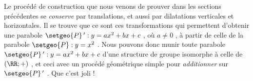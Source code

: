 Le procédé de construction que nous venons de prouver dans les sections précédentes se \emph{\og conserve \fg} par translations, et aussi par dilatations verticales et horizontales.
Il se trouve que ce sont ces transformations qui permettent d'obtenir une parabole $\setgeo{P}\,^\prime : y = a x^2 + b x + c$ , où $a \neq 0$ , à partir de celle de la parabole $\setgeo{P} : y = x^2$ .
Nous pouvons donc munir toute parabole $\setgeo{P}\,^\prime : y = a x^2 + b x + c$ d'une structure de groupe isomorphe à celle de $(\RR ; +)$ , et ceci avec un procédé géométrique simple pour \emph{\og additionner \fg} sur $\setgeo{P}\,^\prime$ . Que c'est joli !
